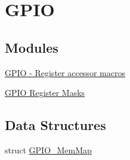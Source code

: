 \hypertarget{group___g_p_i_o___peripheral}{}\section{G\+P\+IO}
\label{group___g_p_i_o___peripheral}
\subsection*{Modules}
\begin{DoxyCompactItemize}
\item 
\hyperlink{group___g_p_i_o___register___accessor___macros}{G\+P\+I\+O -\/ Register accessor macros}
\item 
\hyperlink{group___g_p_i_o___register___masks}{G\+P\+I\+O Register Masks}
\end{DoxyCompactItemize}
\subsection*{Data Structures}
\begin{DoxyCompactItemize}
\item 
struct \hyperlink{struct_g_p_i_o___mem_map}{G\+P\+I\+O\+\_\+\+Mem\+Map}
\end{DoxyCompactItemize}
